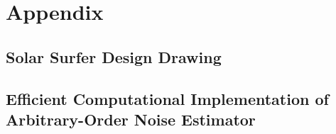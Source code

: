 \documentclass[conf]{new-aiaa}
\begin{document}
    \clearpage


    \section{Appendix}

    \subsection{Solar Surfer Design Drawing}
    \label{sec:solar_surfer_drawing}

    \begin{figure}[H]
        \centering
        \label{fig:solar_surfer_design}
    \end{figure}

    \newpage

    \subsection{Efficient Computational Implementation of Arbitrary-Order Noise Estimator}
    \label{sec:estimator_code_example}
\end{document}
